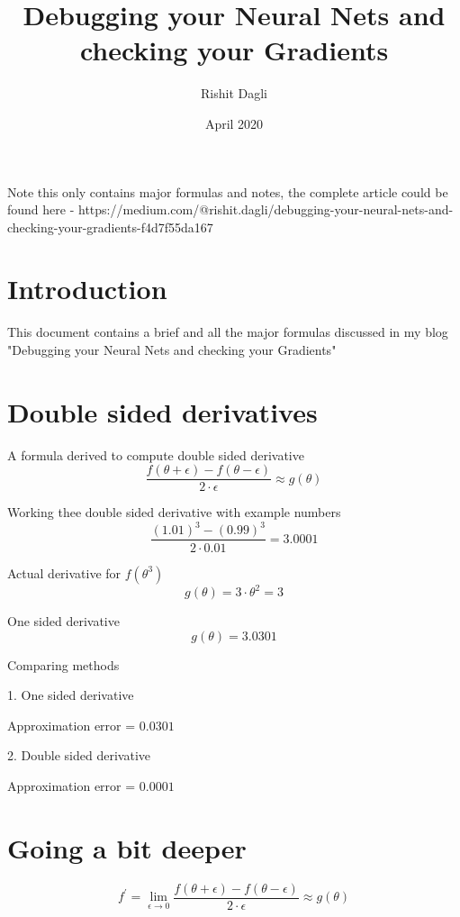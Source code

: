 \documentclass{article}
\title{Debugging your Neural Nets and checking your Gradients}
\author{Rishit Dagli}
\date{April 2020}
\begin{document}
Note this only contains major formulas and notes, the complete article could be found here - https://medium.com/@rishit.dagli/debugging-your-neural-nets-and-checking-your-gradients-f4d7f55da167

\maketitle
\section{Introduction}
This document contains a brief and all the major formulas discussed in my blog "Debugging your Neural Nets and checking your Gradients"

\maketitle
\section{Double sided derivatives}

A formula derived to compute double sided derivative
$$\frac{f(\theta + \epsilon)-f(\theta - \epsilon)}{2 \cdot \epsilon} \approx g(\theta)$$

Working thee double sided derivative with example numbers
$$\frac{(1.01)^3  - (0.99)^3}{2 \cdot 0.01} = 3.0001$$

Actual derivative for $f(\theta ^ 3)$
$$g(\theta) = 3 \cdot \theta ^2 = 3$$

One sided derivative
$$g(\theta) = 3.0301$$

Comparing methods
\vspace{10}

1. One sided derivative

Approximation error = $0.0301$
\vspace{5}

2. Double sided derivative

Approximation error = $0.0001$

\maketitle
\section{Going a bit deeper}

$$f^{'}=\lim_{\epsilon \to 0} \frac{f(\theta + \epsilon)-f(\theta - \epsilon)}{2 \cdot \epsilon} \approx g(\theta)$$ 
\end{document}
